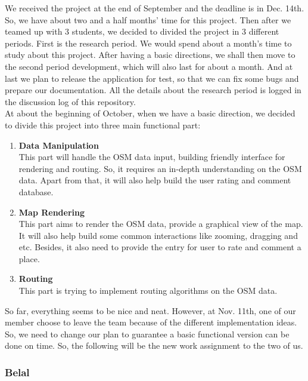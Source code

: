 \documentclass[a4paper, 12pt, english]{book}
\begin{document}
We received the project at the end of September and the deadline is in Dec. 14th. So, we have about two and a half months' time for this project. Then after we teamed up with 3 students, we decided to divided the project in 3 different periods. First is the research period. We would spend about a month's time to study about this project. After having a basic directions, we shall then move to the second period development, which will also last for about a month. And at last we plan to release the application for test, so that we can fix some bugs and prepare our documentation. All the details about the research period is logged in the discussion log of this repository. \\
At about the beginning of October, when we have a basic direction, we decided to divide this project into three main functional part: 
\begin{enumerate}
	\item {\textbf{Data Manipulation}}\\
	
	This part will handle the OSM data input, building friendly interface for rendering and routing. So, it requires an in-depth understanding on the OSM data. Apart from that, it will also help build the user rating and comment database.
	\item {\textbf{Map Rendering}}\\
	
	This part aims to render the OSM data, provide a graphical view of the map. It will also help build some common interactions like zooming, dragging and etc. Besides, it also need to provide the entry for user to rate and comment a place.
	\item {\textbf{Routing}}\\
	
	This part is trying to implement routing algorithms on the OSM data.
\end{enumerate}

So far, everything seems to be nice and neat. However, at Nov. 11th, one of our member choose to leave the team because of the different implementation ideas. So, we need to change our plan to guarantee a basic functional version can be done on time. So, the following will be the new work assignment to the two of us.

\subsubsection{Belal}
\end{document}
